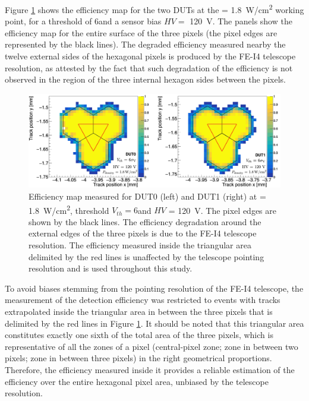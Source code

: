 		Figure \ref{im:ATTRACT_effmap} shows the efficiency map for the two DUTs at the \power = \SI{1.8}{\watt/\centi\meter^2} working point, for a threshold of 6\noise and a sensor bias $HV = $ \SI{120}{\volt}. 
		The panels show the efficiency map for the entire surface of the three pixels (the pixel edges are represented by the black lines). The degraded efficiency measured nearby the twelve external sides of the hexagonal pixels is produced by the FE-I4 telescope resolution, as attested by the fact that such degradation of the efficiency is not observed in the region of the three internal hexagon sides between the pixels. 

		\begin{figure}[h]
			\centering
			\includegraphics[width=0.99\linewidth]{files/ATTRACT_paper/EfficiencyMap_120V_150uA}
			\caption{Efficiency map measured for DUT0 (left) and DUT1 (right) at  \power = \SI{1.8}{\watt/\centi\meter^2}, threshold $ V_{th} = 6$\noise and $HV$ = \SI{120}{\volt}. The pixel edges are shown by the black lines. The efficiency degradation around the external edges of the three pixels is due to the FE-I4 telescope resolution. The efficiency measured inside the triangular area delimited by the red lines is unaffected by the telescope pointing resolution and is used throughout this study.}
			\label{im:ATTRACT_effmap} 
		\end{figure}
		
		To avoid biases stemming from the pointing resolution of the FE-I4 telescope, the measurement of the detection efficiency was restricted to events with tracks extrapolated inside the triangular area in between the three pixels that is delimited by the red lines in Figure \ref{im:ATTRACT_effmap}. It should be noted that this triangular area constitutes exactly one sixth of the total area of the three pixels, which is representative of all the zones of a pixel (central-pixel zone; zone in between two pixels; zone in between three pixels) in the right geometrical proportions. Therefore, the efficiency measured inside it provides a reliable estimation of the efficiency over the entire hexagonal pixel area, unbiased by the telescope resolution.
		
